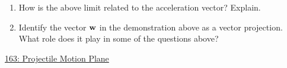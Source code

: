 \documentclass{ximera}
\begin{document}
\begin{question}
\begin{enumerate}
\item How is the above limit related to the acceleration vector? Explain.

\item Identify the vector ${\bf w}$ in the demonstration above as a vector projection. What role does it play in some of the questions above?

\end{enumerate}

\begin{onlineOnly}
    \begin{center}
\end{center}
\end{onlineOnly}

\href{https://www.geogebra.org/classic/vbnga9rj}{163: Projectile Motion Plane}

\end{question}
\end{document}
